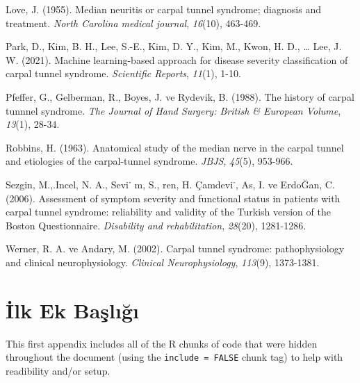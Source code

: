 \documentclass[12pt,twoside]{deuthesis}
\begin{document}
\begin{CSLReferences}{1}{0}
\leavevmode{}%
Love, J. (1955). Median neuritis or carpal tunnel syndrome; diagnosis and treatment. \emph{North Carolina medical journal}, \emph{16}(10), 463-469.

\leavevmode{}%
Park, D., Kim, B. H., Lee, S.-E., Kim, D. Y., Kim, M., Kwon, H. D., \ldots{} Lee, J. W. (2021). Machine learning-based approach for disease severity classification of carpal tunnel syndrome. \emph{Scientific Reports}, \emph{11}(1), 1-10.

\leavevmode{}%
Pfeffer, G., Gelberman, R., Boyes, J. ve Rydevik, B. (1988). The history of carpal tunnnel syndrome. \emph{The Journal of Hand Surgery: British \& European Volume}, \emph{13}(1), 28-34.

\leavevmode{}%
Robbins, H. (1963). Anatomical study of the median nerve in the carpal tunnel and etiologies of the carpal-tunnel syndrome. \emph{JBJS}, \emph{45}(5), 953-966.

\leavevmode{}%
Sezgin, M.,.Incel, N. A., Sevi˙ m, S., ren, H. Çamdevi˙, As, I. ve ErdoĞan, C. (2006). Assessment of symptom severity and functional status in patients with carpal tunnel syndrome: reliability and validity of the Turkish version of the Boston Questionnaire. \emph{Disability and rehabilitation}, \emph{28}(20), 1281-1286.

\leavevmode{}%
Werner, R. A. ve Andary, M. (2002). Carpal tunnel syndrome: pathophysiology and clinical neurophysiology. \emph{Clinical Neurophysiology}, \emph{113}(9), 1373-1381.

\end{CSLReferences}
\setlength{\parindent}{-0.20in}
\setlength{\leftskip}{0.20in}
\setlength{\parskip}{8pt}

\appendix

\hypertarget{ilk-ek-baux15flux131ux11fux131}{%
\chapter{İlk Ek Başlığı}\label{ilk-ek-baux15flux131ux11fux131}}

This first appendix includes all of the R chunks of code that were hidden throughout the document (using the \texttt{include\ =\ FALSE} chunk tag) to help with readibility and/or setup.
\end{document}
